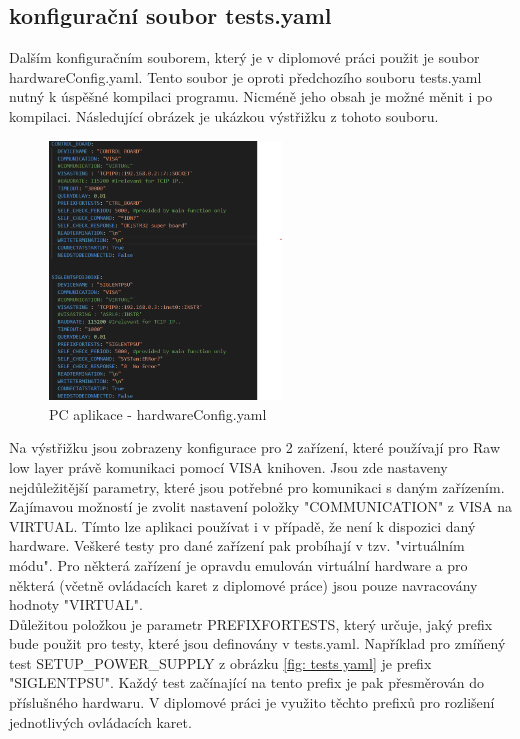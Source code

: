 \subsection{konfigurační soubor tests.yaml}
Dalším konfiguračním souborem, který je v diplomové práci použit je soubor hardwareConfig.yaml. Tento soubor je oproti
předchozího souboru tests.yaml nutný k úspěšné kompilaci programu. Nicméně jeho obsah je možné měnit i po kompilaci.
Následující obrázek je ukázkou výstřižku z tohoto souboru.
\begin{figure}[ht!]
    \centering
    \includegraphics[width = 0.55\textwidth]{obrazky/hardwareConfig.png}
    \caption{PC aplikace - hardwareConfig.yaml}
    \label{fig: hardwareConfig yaml}
\end{figure}
\clearpage

Na výstřižku jsou zobrazeny konfigurace pro 2 zařízení, které používají pro Raw low layer právě komunikaci pomocí VISA knihoven.
Jsou zde nastaveny nejdůležitější parametry, které jsou potřebné pro komunikaci s daným zařízením. Zajímavou možností je zvolit
nastavení položky "COMMUNICATION" z VISA na VIRTUAL. Tímto lze aplikaci používat i v případě, že není k dispozici daný hardware.
Veškeré testy pro dané zařízení pak probíhají v tzv. "virtuálním módu". Pro některá zařízení je opravdu emulován virtuální hardware
a pro některá (včetně ovládacích karet z diplomové práce) jsou pouze navracovány hodnoty "VIRTUAL".\\

Důležitou položkou je parametr PREFIXFORTESTS, který určuje, jaký prefix bude použit pro testy, které jsou definovány v tests.yaml.
Například pro zmíňený test SETUP\_POWER\_SUPPLY z obrázku \ref{fig: tests yaml} je prefix "SIGLENTPSU". Každý test začínající na tento
prefix je pak přesměrován do příslušného hardwaru. V diplomové práci je využito těchto prefixů pro rozlišení jednotlivých ovládacích karet.